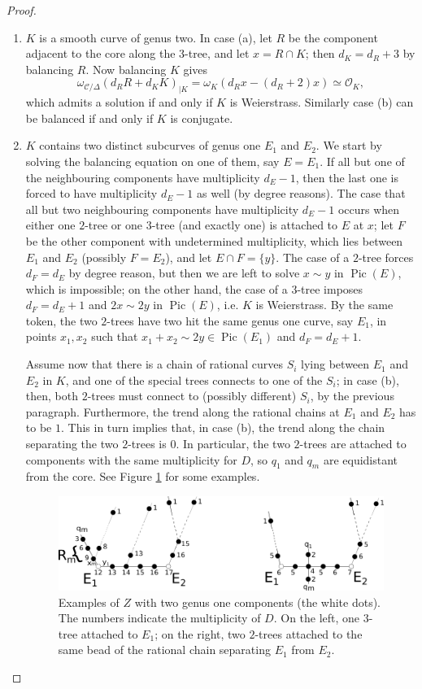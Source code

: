 \documentclass[11pt]{amsart}
\newcommand{\OO}{\mathcal O}
\newcommand{\dvr}{\Delta}
\newcommand{\Pic}{\operatorname{Pic}}
\theoremstyle{plain}
\theoremstyle{definition}
\begin{document}
\begin{proof}
\begin{enumerate}[leftmargin=.6cm]

 \item $K$ is a smooth curve of genus two. In case (a), let $R$ be the component adjacent to the core along the $3$-tree, and let $x=R\cap K$; then $d_K=d_R+3$ by balancing $R$. Now balancing $K$ gives \[\omega_{\mathcal C/\dvr}(d_RR+d_KK)_{|K}=\omega_K(d_Rx-(d_R+2)x)\simeq\OO_K,\]
 which admits a solution if and only if $K$ is Weierstrass. Similarly case (b) can be balanced if and only if $K$ is conjugate.
 
 \item $K$ contains two distinct subcurves of genus one $E_1$ and $E_2$. We start by solving the balancing equation on one of them, say $E=E_1$.
 If all but one of the neighbouring components have multiplicity $d_E-1$, then the last one is forced to have multiplicity $d_E-1$ as well (by degree reasons). The case that all but two neighbouring components have multiplicity $d_E-1$ occurs when either one $2$-tree or one $3$-tree (and exactly one) is attached to $E$ at $x$; let $F$ be the other component with undetermined multiplicity, which lies between $E_1$ and $E_2$ (possibly $F=E_2$), and let $E\cap F=\{y\}$. The case of a $2$-tree forces $d_F=d_E$ by degree reason, but then we are left to solve $x\sim y$ in $\Pic(E)$, which is impossible; on the other hand, the case of a $3$-tree imposes $d_F=d_E+1$ and $2x\sim 2y$ in $\Pic(E)$, i.e. $K$ is Weierstrass. By the same token, the two $2$-trees have two hit the same genus one curve, say $E_1$, in points $x_1,x_2$ such that $x_1+x_2\sim 2y\in\Pic(E_1)$ and $d_F=d_E+1$.
 
 Assume now that there is a chain of rational curves $S_i$ lying between $E_1$ and $E_2$ in $K$, and one of the special trees connects to one of the $S_i$; in case (b), then, both $2$-trees must connect to (possibly different) $S_i$, by the previous paragraph. Furthermore, the trend along the rational chains at $E_1$ and $E_2$ has to be $1$. This in turn implies that, in case (b), the trend along the chain separating the two $2$-trees is $0$. In particular, the two $2$-trees are attached to components with the same multiplicity for $D$, so $q_1$ and $q_m$ are equidistant from the core. See Figure \ref{fig:E1E2} for some examples.
 
 \begin{figure}[h]
 \includegraphics[width=.8\textwidth]{E1E2example} 
 \caption{Examples of $Z$ with two genus one components (the white dots). The numbers indicate the multiplicity of $D$. On the left, one $3$-tree attached to $E_1$; on the right, two $2$-trees attached to the same bead of the rational chain separating $E_1$ from $E_2$.}\label{fig:E1E2}
  \end{figure}
  

\end{enumerate}
\end{proof}
\end{document}
